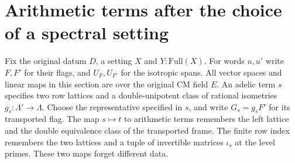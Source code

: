 \section{Arithmetic terms after the choice of a spectral setting}
Fix the original datum $D$, a setting $X$ and $Y:\mathrm{Full}(X)$.
For words $u,u'$ write $F,F'$ for their flags, and $U_F,U_{F'}$ for
the isotropic spans. All vector spaces and linear maps in this section
are over the original CM field $E$. An adelic term $s$ specifies two
row lattices and a double-unipotent class of rational isometries
$g_s:\Lambda'\longrightarrow\Lambda$. Choose the representative
specified in $s$, and write $G_s=g_sF'$ for its transported flag.
The map $s\mapsto t$ to arithmetic terms remembers the left lattice
and the double equivalence class of the transported frame. The finite
row index remembers the two lattices and a tuple of invertible matrices
$\iota_s$ at the level primes. These two maps forget different data.

